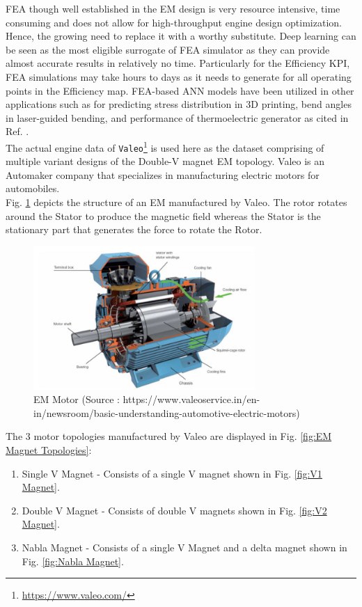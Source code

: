 \documentclass{report} %
\begin{document}
\ac{FEA} though well established in the \ac{EM} design is very resource intensive, time consuming and does not allow for high-throughput engine design optimization. 
Hence, the growing need to replace it with a worthy substitute.
Deep learning can be seen as the most eligible surrogate of \ac{FEA} simulator as they can provide almost accurate results in relatively no time. 
Particularly for the Efficiency \ac{KPI}, \ac{FEA} simulations may take hours to days as it needs to generate for all operating points in the Efficiency map.
\ac{FEA}-based \ac{ANN} models have been utilized in other applications such as for predicting stress distribution in 3D printing, bend angles in laser-guided bending, 
and performance of thermoelectric generator as cited in Ref. \cite{SM EMT-2020}.\\

The actual engine data of \texttt{Valeo}\footnote{\url{https://www.valeo.com/}} is used here as the dataset comprising of multiple variant designs of the Double-V 
magnet \ac{EM} topology. Valeo is an Automaker company that specializes in manufacturing electric motors for automobiles.\\
Fig. \ref{fig:Valeo Motor Structure} depicts the structure of an \ac{EM} manufactured by Valeo. 
The rotor rotates around the Stator to produce the magnetic field whereas the Stator is the stationary part that generates the force to rotate the Rotor.         
\begin{figure}[H]
    \centering
    \includegraphics[width=0.75\textwidth]{./ReportImages/ValeoMotorStructure.jpg} 
    \caption{\ac{EM} Motor (Source : https://www.valeoservice.in/en-in/newsroom/basic-understanding-automotive-electric-motors)}
    \label{fig:Valeo Motor Structure}
\end{figure}

The 3 motor topologies manufactured by Valeo are displayed in Fig. \ref{fig:EM Magnet Topologies}:
\begin{enumerate}[nosep]
    \item Single V Magnet - Consists of a single V magnet shown in Fig. \ref{fig:V1 Magnet}.
    \item Double V Magnet - Consists of double V magnets shown in Fig. \ref{fig:V2 Magnet}.
    \item Nabla Magnet - Consists of a single V Magnet and a delta magnet shown in Fig. \ref{fig:Nabla Magnet}.
\end{enumerate}
\end{document}
